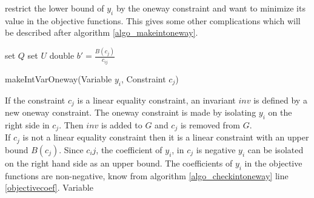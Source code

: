 restrict the lower bound of $y_i$ by the oneway constraint and want to minimize its value in the objective functions. 
This gives some other complications which will be described after algorithm \ref{algo_makeintoneway}. \\ 
\IncMargin{1em}
\begin{algorithm}[H]
\algdata
{}
\BlankLine
set $Q$ 
set $U$ 
double $b' = \frac{B(c_j)}{c_{ij}}$ \;
 \;
 

 \caption{makeIntVarOneway(\textsf{Variable} $y_i$, \textsf{Constraint} $c_j$)} \label{algo_makeintoneway}
 \end{algorithm}\DecMargin{1em} \noindent 
If the constraint $c_j$ is a linear equality constraint, an invariant $inv$ is defined by a new oneway constraint. The 
oneway constraint is made by isolating $y_i$ on the right side in $c_j$. Then $inv$ is added to $G$ and $c_j$ is 
removed from $G$. \\ 
If $c_j$ is not a linear equality constraint then it is a linear constraint with an upper bound $B(c_j)$. Since $c_ij$, 
the coefficient of $y_i$, in $c_j$ is negative $y_i$ can be isolated on the right hand side as an upper bound. The 
coefficients of $y_i$ in the objective functions are non-negative, know from algorithm \ref{algo_checkintoneway} line 
\ref{objectivecoef}. Variable    


